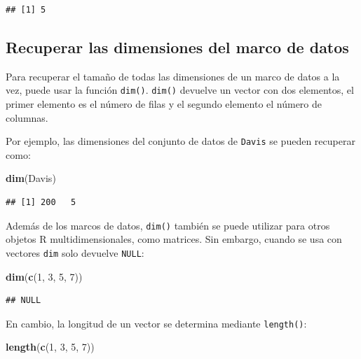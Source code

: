 \documentclass[
]{book}
\newenvironment{Shaded}{\begin{snugshade}}{\end{snugshade}}
\newcommand{\DecValTok}[1]{\textcolor[rgb]{0.00,0.00,0.81}{#1}}
\newcommand{\KeywordTok}[1]{\textcolor[rgb]{0.13,0.29,0.53}{\textbf{#1}}}
\newcommand{\NormalTok}[1]{#1}
\begin{document}
\begin{verbatim}
## [1] 5
\end{verbatim}

\hypertarget{recuperar-las-dimensiones-del-marco-de-datos}{%
\subsection{Recuperar las dimensiones del marco de datos}\label{recuperar-las-dimensiones-del-marco-de-datos}}

Para recuperar el tamaño de todas las dimensiones de un marco de datos a la vez, puede usar la función \texttt{dim()}. \texttt{dim()} devuelve un vector con dos elementos, el primer elemento es el número de filas y el segundo elemento el número de columnas.

Por ejemplo, las dimensiones del conjunto de datos de \texttt{Davis} se pueden recuperar como:

\begin{Shaded}
\begin{Highlighting}[]
\KeywordTok{dim}\NormalTok{(Davis)}
\end{Highlighting}
\end{Shaded}

\begin{verbatim}
## [1] 200   5
\end{verbatim}

Además de los marcos de datos, \texttt{dim()} también se puede utilizar para otros objetos R multidimensionales, como matrices. Sin embargo, cuando se usa con vectores \texttt{dim} solo devuelve \texttt{NULL}:

\begin{Shaded}
\begin{Highlighting}[]
\KeywordTok{dim}\NormalTok{(}\KeywordTok{c}\NormalTok{(}\DecValTok{1}\NormalTok{, }\DecValTok{3}\NormalTok{, }\DecValTok{5}\NormalTok{, }\DecValTok{7}\NormalTok{))}
\end{Highlighting}
\end{Shaded}

\begin{verbatim}
## NULL
\end{verbatim}

En cambio, la longitud de un vector se determina mediante \texttt{length()}:

\begin{Shaded}
\begin{Highlighting}[]
\KeywordTok{length}\NormalTok{(}\KeywordTok{c}\NormalTok{(}\DecValTok{1}\NormalTok{, }\DecValTok{3}\NormalTok{, }\DecValTok{5}\NormalTok{, }\DecValTok{7}\NormalTok{))}
\end{Highlighting}
\end{Shaded}
\end{document}
